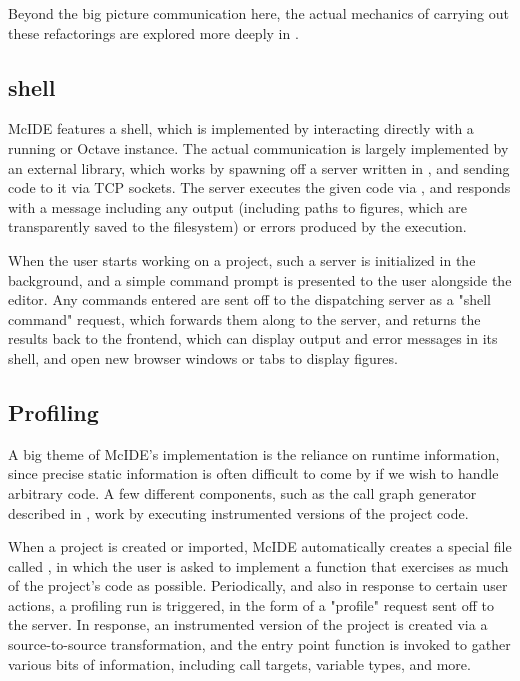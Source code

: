 Beyond the big picture communication here, the actual mechanics of carrying out
these refactorings are explored more deeply in
.

\subsection{\matlab shell}

McIDE features a \matlab shell, which is implemented by interacting directly
with a running \matlab or Octave instance. The actual communication is largely
implemented by an external library, which works by spawning off a server
written in \matlab, and sending code to it via TCP sockets. The server executes
the given code via , and responds with a message including any
output (including paths to figures, which are transparently saved to the
filesystem) or errors produced by the execution.

When the user starts working on a project, such a \matlab server is initialized
in the background, and a simple command prompt is presented to the user
alongside the editor. Any commands entered are sent off to the dispatching
server as a "shell command" request, which forwards them along to the \matlab
server, and returns the results back to the frontend, which can display output
and error messages in its shell, and open new browser windows or tabs to
display figures.

\subsection{Profiling}

A big theme of McIDE's implementation is the reliance on runtime information,
since precise static information is often difficult to come by if we wish to
handle arbitrary \matlab code. A few different components, such as the call
graph generator described in , work
by executing instrumented versions of the project code.

When a project is created or imported, McIDE automatically creates a special
file called , in which the user is asked to implement
a function that exercises as much of the project's code as possible.
Periodically, and also in response to certain user actions, a profiling run is
triggered, in the form of a "profile" request sent off to the server. In
response, an instrumented version of the project is created via a
source-to-source transformation, and the entry point function is invoked to
gather various bits of information, including call targets, variable types, and
more.
